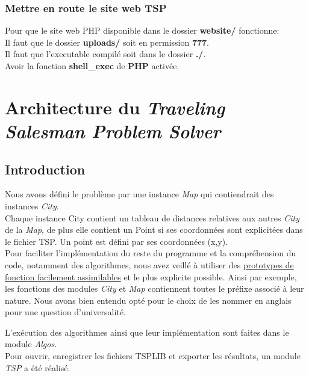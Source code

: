 \documentclass[12pt]{report}
\begin{document}
\subsection{Mettre en route le site web TSP}

Pour que le site web PHP disponible dans le dossier \textbf{website/} fonctionne:\\
Il faut que le dossier \textbf{uploads/} soit en permission \textbf{777}.\\
Il faut que l'executable compilé soit dans le dossier \textbf{./}.\\
Avoir la fonction \textbf{shell\_exec} de \textbf{PHP} activée.



\chapter{Architecture du \textit{Traveling Salesman Problem Solver}}

\section{Introduction}


Nous avons défini le problème par une instance \textit{Map} qui contiendrait des instances \textit{City}. \\
Chaque instance City contient un tableau de distances relatives aux autres \textit{City} de la \textit{Map}, de plus elle contient un Point si ses coordonnées sont explicitées dans le fichier TSP. 
Un point est défini par ses coordonnées (x,y).\\

Pour faciliter l'implémentation du reste du programme et la compréhension du code, notamment des algorithmes, nous avez veillé à utiliser des \underline{prototypes de fonction facilement assimilables} et le plus explicite possible. Ainsi par exemple, les fonctions des modules \textit{City} et \textit{Map} contiennent toutes le préfixe associé à leur nature.
Nous avons bien entendu opté pour le choix de les nommer en anglais pour une question d'universalité.

L'exécution des algorithmes ainsi que leur implémentation sont faites dans le module \textit{Algos}. \\
Pour ouvrir, enregistrer les fichiers TSPLIB et exporter les résultats, un module \textit{TSP} a été réalisé.\\
\end{document}
